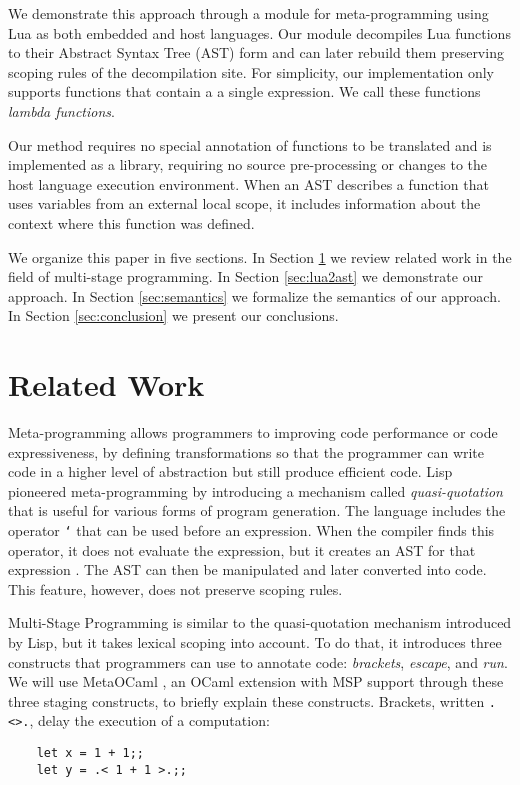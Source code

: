 \documentclass[english]{llncs}
\begin{document}
We demonstrate this approach through a module for meta-programming using Lua
as both embedded and host languages.
Our module decompiles Lua functions to their Abstract Syntax Tree (AST) form
and can later rebuild them preserving scoping rules of the decompilation site.
For simplicity, our implementation only supports functions that contain a
a single expression.
We call these functions \emph{lambda functions}.

Our method requires no special annotation of functions to be translated and is
implemented as a library, requiring no source pre-processing or changes to
the host language execution environment.
When an AST describes a function that uses variables from an
external local scope, it includes information about the context
where this function was defined.

We organize this paper in five sections.
In Section \ref{sec:related} we review related work in the field
of multi-stage programming.
In Section \ref{sec:lua2ast} we demonstrate our approach.
In Section \ref{sec:semantics} we formalize the semantics of our approach.
In Section \ref{sec:conclusion} we present our conclusions.

\section{Related Work}
\label{sec:related}

Meta-programming allows programmers to improving code performance
or code expressiveness, by defining transformations so that the programmer
can write code in a higher level of abstraction but still produce
efficient code.
Lisp \cite{McCarthy1960RFS} pioneered meta-programming by introducing
a mechanism called \emph{quasi-quotation}
that is useful for various forms of program generation.
The language includes the operator \texttt{`} that can be used before an expression.
When the compiler finds this operator, it does not evaluate the expression,
but it creates an AST for that expression \cite{Bawden1999quasiquotation}.
The AST can then be manipulated and later converted into code.
This feature, however, does not preserve scoping rules.

Multi-Stage Programming \cite{Taha1999MSP,Taha2004gentle,Taha2008gentle} is
similar to the quasi-quotation mechanism introduced by Lisp,
but it takes lexical scoping into account.
To do that, it introduces three constructs that programmers can use to
annotate code: \emph{brackets}, \emph{escape}, and \emph{run}.
We will use MetaOCaml \cite{Calcagno2003implementing}, an OCaml extension
with MSP support through these three staging constructs, to briefly explain
these constructs.
%
Brackets, written \texttt{.<>.}, delay the execution of a computation:
\begin{verbatim}
    let x = 1 + 1;;
    let y = .< 1 + 1 >.;;
\end{verbatim}
\end{document}
